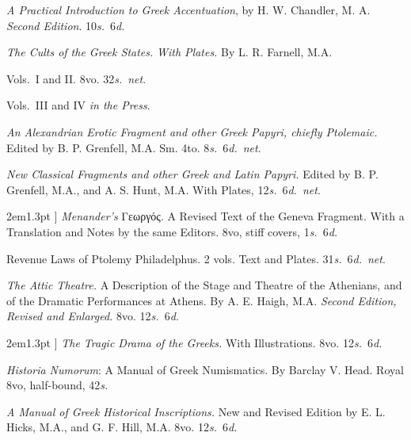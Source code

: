 \documentclass[12pt,oneside]{book}[2021/10/04]
\newcommand{\longdash}{\rule[.5ex]{2em}{1.3pt}
}
\newenvironment{advlist}{
  \begin{description}[leftmargin=1em, parsep=0.2ex, listparindent=1em,]
}{\end{description}}
\newenvironment{vollist}{
\begin{description}[nosep, topsep=-1ex, itemindent=-1em, leftmargin=2em]
}{\end{description}}
\newcommand{\¬}{\hphantom{0}}
\begin{document}
\begin{advlist}
\item[Chandler.] \textit{A Practical Introduction
to Greek Accentuation}, by H. W.
Chandler, M. A. \textit{Second Edition}. 10\textit{s.}\ 6\textit{d.}

\item[Farnell.] \textit{The Cults of the Greek
States.} \textit{With Plates.} By L. R. Farnell,
M.A.
\begin{vollist}
\item Vols.\ I and II. 8vo. 32\textit{s.}\ \textit{net}.
\item Vols.\ III and IV \textit{in the Press}.
\end{vollist}

\item[Grenfell.] \textit{An Alexandrian
Erotic Fragment and other Greek Papyri,
chiefly Ptolemaic.} Edited by B. P.
Grenfell, M.A. Sm. 4to. 8\textit{s.}\ 6\textit{d.}\ \textit{net}.

\item[Grenfell and Hunt.] \textit{New
Classical Fragments and other Greek
and Latin Papyri.} Edited by B. P.
Grenfell, M.A., and A. S. Hunt,
M.A. With Plates, 12\textit{s.}\ 6\textit{d.}\ \textit{net}.

\item[\longdash] \textit{Menander's} {\greekfont Γεωργός}.
A Revised Text of the Geneva
Fragment. With a Translation
and Notes by the same Editors.
8vo, stiff covers, 1\textit{s.}\ 6\textit{d.}

\item[Grenfell and Mahaffy.] Revenue
Laws of Ptolemy Philadelphus.
2 vols. Text and Plates. 31\textit{s.}\ 6\textit{d.}\ \textit{net}.

\item[Haigh.] \textit{The Attic Theatre.}
A Description of the Stage and
Theatre of the Athenians, and of the
Dramatic Performances at Athens.
By A. E. Haigh, M.A. \textit{Second Edition,
Revised and Enlarged.} 8vo. 12\textit{s.}\ 6\textit{d.}

\item[\longdash] \textit{The Tragic Drama of
the Greeks.} With Illustrations.
8vo. 12\textit{s.}\ 6\textit{d.}

\item[Head.] \textit{Historia Numorum}:
A Manual of Greek Numismatics.
By Barclay V. Head. Royal 8vo,
half-bound, 42\textit{s.}

\item[Hicks.] \textit{A Manual of Greek
Historical Inscriptions.} New and
Revised Edition by E. L. Hicks,
M.A., and G. F. Hill, M.A. 8vo.
12\textit{s.}\ 6\textit{d.}


\end{advlist}
\end{document}

